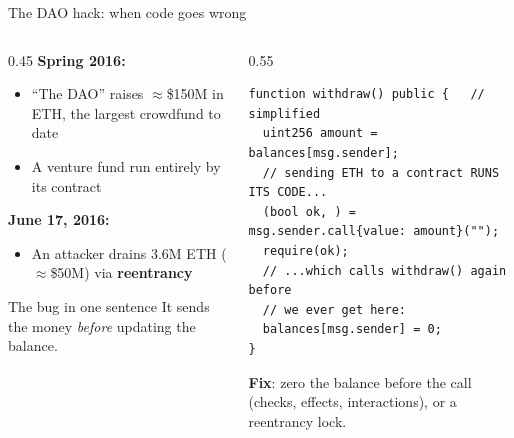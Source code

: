 \ifdefined\PRESENTATION\else\PassOptionsToClass{handout}{beamer}\fi\documentclass[aspectratio=169, lualatex]{beamer}
\begin{document}
\begin{frame}[fragile]{The DAO hack: when code goes wrong}
	\begin{columns}[c]
		\begin{column}{0.45\textwidth}
			\textbf{Spring 2016:}
			\begin{itemize}
				\item ``The DAO'' raises $\approx$\$150M in ETH, the largest crowdfund to date
				\item A venture fund run entirely by its contract
			\end{itemize}
			\textbf{June 17, 2016:}
			\begin{itemize}
				\item An attacker drains 3.6M ETH ($\approx$\$50M) via \textbf{reentrancy}
			\end{itemize}
			\begin{alertblock}{The bug in one sentence}
				It sends the money \emph{before} updating the balance.
			\end{alertblock}
		\end{column}
		\begin{column}{0.55\textwidth}
			\scriptsize
			\begin{verbatim}
function withdraw() public {   // simplified
  uint256 amount = balances[msg.sender];
  // sending ETH to a contract RUNS ITS CODE...
  (bool ok, ) = msg.sender.call{value: amount}("");
  require(ok);
  // ...which calls withdraw() again before
  // we ever get here:
  balances[msg.sender] = 0;
}
\end{verbatim}
			\normalsize
			\textbf{Fix}: zero the balance before the call (checks, effects, interactions), or a reentrancy lock.
		\end{column}
	\end{columns}
\end{frame}
\end{document}
